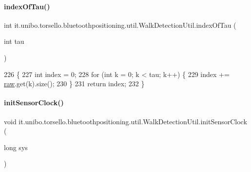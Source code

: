 \paragraph{\texorpdfstring{index\+Of\+Tau()}{indexOfTau()}}
{\footnotesize\ttfamily int it.\+unibo.\+torsello.\+bluetoothpositioning.\+util.\+Walk\+Detection\+Util.\+index\+Of\+Tau (\begin{DoxyParamCaption}\item[{int}]{tau }\end{DoxyParamCaption})\hspace{0.3cm}{\ttfamily [private]}}


\begin{DoxyCode}
226                                     \{
227         \textcolor{keywordtype}{int} index = 0;
228         \textcolor{keywordflow}{for} (\textcolor{keywordtype}{int} k = 0; k < tau; k++) \{
229             index += \hyperlink{classit_1_1unibo_1_1torsello_1_1bluetoothpositioning_1_1util_1_1WalkDetectionUtil_a985270e2b9d4202985cb987eef136a9e_a985270e2b9d4202985cb987eef136a9e}{raw}.get(k).size();
230         \}
231         \textcolor{keywordflow}{return} index;
232     \}
\end{DoxyCode}
\hypertarget{classit_1_1unibo_1_1torsello_1_1bluetoothpositioning_1_1util_1_1WalkDetectionUtil_a65acb6d1ea859efe8cbee1edafc05bf0_a65acb6d1ea859efe8cbee1edafc05bf0}{}\label{classit_1_1unibo_1_1torsello_1_1bluetoothpositioning_1_1util_1_1WalkDetectionUtil_a65acb6d1ea859efe8cbee1edafc05bf0_a65acb6d1ea859efe8cbee1edafc05bf0} 
\paragraph{\texorpdfstring{init\+Sensor\+Clock()}{initSensorClock()}}
{\footnotesize\ttfamily void it.\+unibo.\+torsello.\+bluetoothpositioning.\+util.\+Walk\+Detection\+Util.\+init\+Sensor\+Clock (\begin{DoxyParamCaption}\item[{long}]{sys }\end{DoxyParamCaption})\hspace{0.3cm}{\ttfamily [private]}}


